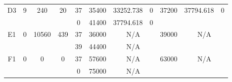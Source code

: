 \begin{sidewaystable}
\begin{tabular}{c||c|c|c||c|c|c|c||c|c|c}
         &
        
      \\
      \hline
      \multirow{2}{*}{D3} &
      \multirow{2}{*}{9} &
      \multirow{2}{*}{240} &
      \multirow{2}{*}{20} &
      37 &
      35400 &
        33252.738 &
        0 &
      \multirow{2}{*}{37200} &
        \multirow{2}{*}{37794.618} &
        \multirow{2}{*}{0}
      \\
      \cline{5-8}
       &
       &
       &
       &
      0 &
      41400 &
        37794.618 &
        0 &
      
         &
        
      \\
      \hline
      \multirow{2}{*}{E1} &
      \multirow{2}{*}{0} &
      \multirow{2}{*}{10560} &
      \multirow{2}{*}{439} &
      37 &
      36000 &
        \multicolumn{2}{|c||}{N/A} &
      \multirow{2}{*}{39000} &
        \multicolumn{2}{c}{\multirow{2}{*}{N/A}}
      \\
      \cline{5-8}
       &
       &
       &
       &
      39 &
      44400 &
        \multicolumn{2}{|c||}{N/A} &
      
        
      \\
      \hline
      \multirow{2}{*}{F1} &
      \multirow{2}{*}{0} &
      \multirow{2}{*}{0} &
      \multirow{2}{*}{0} &
      37 &
      57600 &
        \multicolumn{2}{|c||}{N/A} &
      \multirow{2}{*}{63000} &
        \multicolumn{2}{c}{\multirow{2}{*}{N/A}}
      \\
      \cline{5-8}
       &
       &
       &
       &
      0 &
      75000 &
        \multicolumn{2}{|c||}{N/A} &
      
        
      \\
\end{tabular}
\label{table:RASDATASET1} 
\end{sidewaystable}